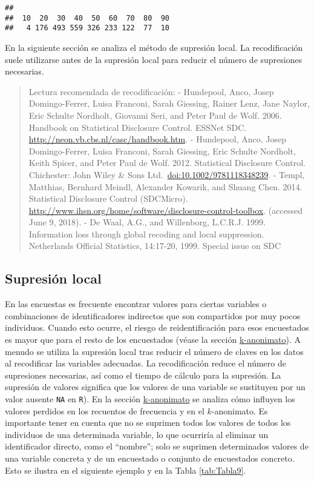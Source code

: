 \documentclass[
]{book}
\theoremstyle{definition}
\theoremstyle{definition}
\theoremstyle{definition}
\theoremstyle{definition}
\theoremstyle{remark}
\begin{document}
\begin{verbatim}
## 
##  10  20  30  40  50  60  70  80  90 
##   4 176 493 559 326 233 122  77  10
\end{verbatim}

En la siguiente sección se analiza el método de supresión local. La recodificación suele utilizarse antes de la supresión local para reducir el número de supresiones necesarias.

\begin{quote}
Lectura recomendada de recodificación:
- Hundepool, Anco, Josep Domingo-Ferrer, Luisa Franconi, Sarah Giessing, Rainer Lenz, Jane Naylor, Eric Schulte Nordholt, Giovanni Seri, and Peter Paul de Wolf. 2006. Handbook on Statistical Disclosure Control. ESSNet SDC. \url{http://neon.vb.cbs.nl/casc/handbook.htm}.
- Hundepool, Anco, Josep Domingo-Ferrer, Luisa Franconi, Sarah Giessing, Eric Schulte Nordholt, Keith Spicer, and Peter Paul de Wolf. 2012. Statistical Disclosure Control. Chichester: John Wiley \& Sons Ltd.~\url{doi:10.1002/9781118348239}.
- Templ, Matthias, Bernhard Meindl, Alexander Kowarik, and Shuang Chen. 2014. Statistical Disclosure Control (SDCMicro). \url{http://www.ihsn.org/home/software/disclosure-control-toolbox}. (accessed June 9, 2018).
- De Waal, A.G., and Willenborg, L.C.R.J. 1999. Information loss through global recoding and local suppression. Netherlands Official Statistics, 14:17-20, 1999. Special issue on SDC
\end{quote}

\hypertarget{sup-loc}{%
\subsection{Supresión local}\label{sup-loc}}

En las encuestas es frecuente encontrar valores para ciertas variables o combinaciones de identificadores indirectos que son compartidos por muy pocos individuos. Cuando esto ocurre, el riesgo de reidentificación para esos encuestados es mayor que para el resto de los encuestados (véase la sección \protect\hyperlink{k-anonimato}{k-anonimato}). A menudo se utiliza la supresión local tras reducir el número de claves en los datos al recodificar las variables adecuadas. La recodificación reduce el número de supresiones necesarias, así como el tiempo de cálculo para la supresión. La supresión de valores significa que los valores de una variable se sustituyen por un valor ausente \texttt{NA} en \texttt{R}). En la sección \protect\hyperlink{k-anonimato}{k-anonimato} se analiza cómo influyen los valores perdidos en los recuentos de frecuencia y en el \(k\)-anonimato. Es importante tener en cuenta que no se suprimen todos los valores de todos los individuos de una determinada variable, lo que ocurriría al eliminar un identificador directo, como el ``nombre''; solo se suprimen determinados valores de una variable concreta y de un encuestado o conjunto de encuestados concreto. Esto se ilustra en el siguiente ejemplo y en la Tabla \ref{tab:Tabla9}.
\end{document}
